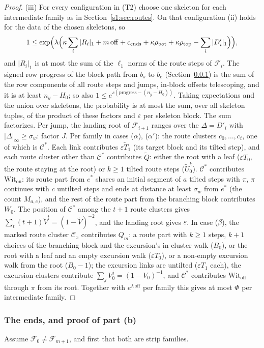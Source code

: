 \documentclass[11pt]{amsart}
\theoremstyle{definition}
\theoremstyle{remark}
\numberwithin{equation}{section}
\newcommand{\cF}{\mathcal{F}}
\newcommand{\eps}{\varepsilon}
\newcommand{\Ut}{\tilde U_0}
\newcommand{\Tt}{\tilde T}
\begin{document}
\begin{proof}
(iii) For every configuration in (T2) choose one skeleton for each intermediate family as in Section~\ref{s1:sec:routes}. On that configuration (ii) holds for the data of the chosen skeletons, so
\[
1\le\exp\Bigl(\lambda\Bigl(\kappa\sum_i|R_i|_1+m\,\mathrm{off}+c_{\mathrm{ends}}+\kappa\rho_{\mathrm{bot}}+\kappa\rho_{\mathrm{top}}-\sum_i|D'_i|_1\Bigr)\Bigr),
\]
and $|R_i|_1$ is at most the sum of the $\ell_1$ norms of the route steps of $\cF_i$. The signed row progress of the block path from $b_s$ to $b_e$ (Section~\ref{s1:sec:ends}) is the sum of the row components of all route steps and jumps, in-block offsets telescoping, and it is at least $n_y-H_0$; so also $1\le e^{s(\text{progress}-(n_y-H_0))}$. Taking expectations and the union over skeletons, the probability is at most the sum, over all skeleton tuples, of the product of these factors and $\eps$ per skeleton block. The sum factorizes. Per jump, the landing root of $\cF_{i+1}$ ranges over the $\Delta=D'_i$ with $|\Delta|_\infty\ge\sigma_w$: factor $J$. Per family in cases ($\alpha$), ($\alpha'$): the route clusters $c_0,\dots,c_t$, one of which is $\mathcal C^*$. Each link contributes $\eps\Tt_1$ (its target block and its tilted step), and each route cluster other than $\mathcal C^*$ contributes $\tilde Q$: either the root with a leaf ($\eps T_0$, the route staying at the root) or $k\ge1$ tilted route steps ($\Ut^k$). $\mathcal C^*$ contributes $\mathrm{Wit}_{\mathrm{on}}$: its route part from $e^*$ shares an initial segment of $a$ tilted steps with $\pi$, $\pi$ continues with $c$ untilted steps and ends at distance at least $\sigma_w$ from $e^*$ (the count $M_{a,c}$), and the rest of the route part from the branching block contributes $W_0$. The position of $\mathcal C^*$ among the $t+1$ route clusters gives $\sum_t(t+1)\tilde V^t=(1-\tilde V)^{-2}$, and the landing root gives $\eps$. In case ($\beta$), the marked route cluster $\mathcal C_x$ contributes $Q_m$: a route part with $k\ge1$ steps, $k+1$ choices of the branching block and the excursion's in-cluster walk ($B_0$), or the root with a leaf and an empty excursion walk ($\eps T_0$), or a non-empty excursion walk from the root ($B_0-1$); the excursion links are untilted ($\eps T_1$ each), the excursion clusters contribute $\sum_jV_0^j=(1-V_0)^{-1}$, and $\mathcal C^*$ contributes $\mathrm{Wit}_{\mathrm{off}}$ through $\pi$ from its root. Together with $e^{\lambda\,\mathrm{off}}$ per family this gives at most $\Phi$ per intermediate family.
\end{proof}

\subsubsection{The ends, and proof of part (b)}\label{s1:sec:ends}
Assume $\cF_0\ne\cF_{m+1}$, and first that both are strip families.
\end{document}
